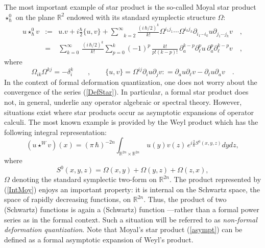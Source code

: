 \documentclass{article}
\newcommand{\R}{\mathbb R}
\def \R{{\mathbb R}}
\newcommand{\re}[1]{(\ref{#1})}
\begin{document}
\noindent The most important example of star product is the so-called Moyal star product $\star^0_\hbar $ on the plane $\R^2$
endowed with its standard symplectic structure $\Omega$:
\begin{eqnarray}\label{asympt}
 u \star^0_\hbar v &:=& u.v + i\frac \hbar 2\{ u,v \} +
 \underset{k=2}{\overset{\infty}\sum}\frac{(i\,\hbar/2)^k}{k!} \Omega^{i_1
 j_1}\cdots \Omega^{i_k j_k} \partial_{i_1\cdots i_k}u \partial_{j_1\cdots
 j_k}v \quad,\\
 \label{MoyalAsympt}
& = &\sum_{k=0}^{\infty} \, \frac{(i\,\hbar/2)^k}{k!}
\sum_{p=0}^{k}(-1)^{p} \,
\frac{k!}{p!(k-p)!}\, \partial_a^{k-p} \partial_\ell^p u \,
\partial_a^{p} \partial_\ell^{k-p} v  \quad ,
\end{eqnarray}
where \begin{equation}\label{PoissonBrackAN}
 \Omega_{ik}\Omega^{kj}=-\delta_i^k\qquad,\qquad \{ u,v \}=\Omega^{ij}\partial_iu\partial_jv: = \partial_a u \partial_\ell v - \partial_\ell u \partial_a
  v \quad.
  \end{equation}
\noindent In the context of formal deformation quantization, one does not worry about the convergence of the series (\ref{DefStar}). In particular, a formal star product does not, in general, underlie any operator algebraic or spectral theory. However, situations exist where star products occur as asymptotic expansions of operator calculi. The most known example is provided by the Weyl product which has the following integral representation:
\begin{equation}\label{IntMoy}
 (u \star^W v)(x) = (\pi\,\hbar)^{-2n} \int_{\R^{2n}\times \R^{2n}} \, u(y) v(z) \, e^{  i\frac{2}{\hbar} S^0(x,y,z)} dy dz,  
\end{equation}
where
\begin{equation}\label{Wphase}
  S^0(x,y,z)  =  \Omega (x,y) + \Omega (y,z) + \Omega (z,x), 
\end{equation}
$\Omega$ denoting the standard symplectic two-form on $\R^{2n}$. The product represented by \re{IntMoy} enjoys an important property: it is internal on the Schwartz space, the space of rapidly decreasing functions, on $\R^{2n}$\cite{Hansen}. Thus, the product of two (Schwartz) functions is again a (Schwartz) function ---rather than a formal power series as in the formal context. Such a situation will be referred to as {\sl non-formal deformation quantization}. Note that Moyal's star product (\ref{asympt}) can be defined as  a formal asymptotic expansion
of Weyl's product.
\end{document}
